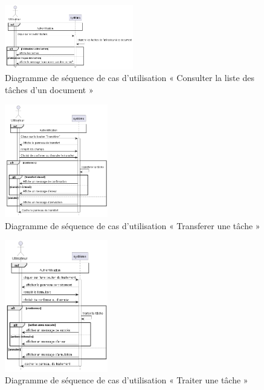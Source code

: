 \begin{figure}[H]
  \centering
  \includegraphics[width=0.5\textwidth]{out/diagrams/documents/previewTasks/preview_tasks_document}
  \caption{Diagramme de séquence de cas d'utilisation « Consulter la liste des tâches d'un document  »}
  \label{fig:sequence_previewTasks}
\end{figure}
\begin{figure}[H]
  \centering
  \includegraphics[width=0.4\textwidth]{out/diagrams/documents/transfer_task/transfer_task}
  \caption{Diagramme de séquence de cas d'utilisation « Transferer une tâche  »}
  \label{fig:sequence_transfer_task}
\end{figure}
\begin{figure}[H]
  \centering
  \includegraphics[width=0.4\textwidth]{out/diagrams/documents/traiter_task/traiter_task}
  \caption{Diagramme de séquence de cas d'utilisation « Traiter une tâche  »}
  \label{fig:sequence_traiter_task}
\end{figure}
